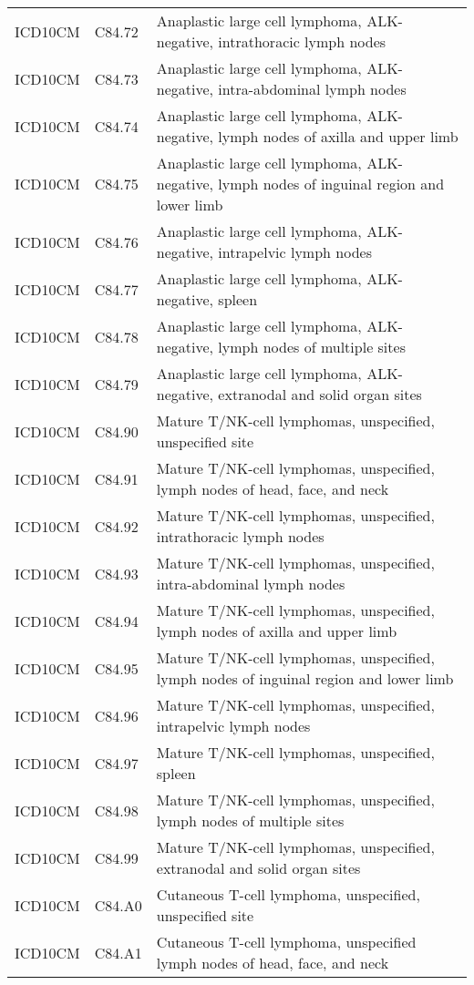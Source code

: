 \begin{longtable}{p{}p{}p{}}
  ICD10CM & C84.72 & Anaplastic large cell lymphoma, ALK-negative, intrathoracic lymph nodes \\ 
  ICD10CM & C84.73 & Anaplastic large cell lymphoma, ALK-negative, intra-abdominal lymph nodes \\ 
  ICD10CM & C84.74 & Anaplastic large cell lymphoma, ALK-negative, lymph nodes of axilla and upper limb \\ 
  ICD10CM & C84.75 & Anaplastic large cell lymphoma, ALK-negative, lymph nodes of inguinal region and lower limb \\ 
  ICD10CM & C84.76 & Anaplastic large cell lymphoma, ALK-negative, intrapelvic lymph nodes \\ 
  ICD10CM & C84.77 & Anaplastic large cell lymphoma, ALK-negative, spleen \\ 
  ICD10CM & C84.78 & Anaplastic large cell lymphoma, ALK-negative, lymph nodes of multiple sites \\ 
  ICD10CM & C84.79 & Anaplastic large cell lymphoma, ALK-negative, extranodal and solid organ sites \\ 
  ICD10CM & C84.90 & Mature T/NK-cell lymphomas, unspecified, unspecified site \\ 
  ICD10CM & C84.91 & Mature T/NK-cell lymphomas, unspecified, lymph nodes of head, face, and neck \\ 
  ICD10CM & C84.92 & Mature T/NK-cell lymphomas, unspecified, intrathoracic lymph nodes \\ 
  ICD10CM & C84.93 & Mature T/NK-cell lymphomas, unspecified, intra-abdominal lymph nodes \\ 
  ICD10CM & C84.94 & Mature T/NK-cell lymphomas, unspecified, lymph nodes of axilla and upper limb \\ 
  ICD10CM & C84.95 & Mature T/NK-cell lymphomas, unspecified, lymph nodes of inguinal region and lower limb \\ 
  ICD10CM & C84.96 & Mature T/NK-cell lymphomas, unspecified, intrapelvic lymph nodes \\ 
  ICD10CM & C84.97 & Mature T/NK-cell lymphomas, unspecified, spleen \\ 
  ICD10CM & C84.98 & Mature T/NK-cell lymphomas, unspecified, lymph nodes of multiple sites \\ 
  ICD10CM & C84.99 & Mature T/NK-cell lymphomas, unspecified, extranodal and solid organ sites \\ 
  ICD10CM & C84.A0 & Cutaneous T-cell lymphoma, unspecified, unspecified site \\ 
  ICD10CM & C84.A1 & Cutaneous T-cell lymphoma, unspecified lymph nodes of head, face, and neck \\ 

\end{longtable}
